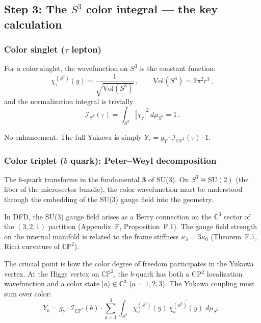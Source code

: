 \documentclass[11pt,a4paper]{article}
\newcommand{\CP}{\mathbb{CP}}
\newcommand{\C}{\mathbb{C}}
\newcommand{\Vol}{\mathrm{Vol}}
\theoremstyle{definition}
\theoremstyle{remark}
\begin{document}
\subsection{Step 3: The $S^3$ color integral --- the key calculation}
\label{sec:key}

\subsubsection{Color singlet ($\tau$ lepton)}

For a color singlet, the wavefunction on $S^3$ is the constant function:
\begin{equation}\label{eq:singlet-wf}
\chi_\tau^{(S^3)}(y) = \frac{1}{\sqrt{\Vol(S^3)}}\,,
\qquad \Vol(S^3) = 2\pi^2 r^3\,,
\end{equation}
and the normalization integral is trivially
\begin{equation}\label{eq:singlet-norm}
\mathcal{I}_{S^3}(\tau) = \int_{S^3} |\chi_\tau|^2\,d\mu_{S^3}
= 1\,.
\end{equation}

No enhancement.  The full Yukawa is simply
$Y_\tau = g_Y \cdot \mathcal{I}_{\CP^2}(\tau) \cdot 1$.

\subsubsection{Color triplet ($b$ quark): Peter--Weyl decomposition}

The $b$-quark transforms in the fundamental $\mathbf{3}$ of SU(3).
On $S^3 \cong \text{SU}(2)$ (the fiber of the microsector bundle),
the color wavefunction must be understood through the embedding of the
SU(3) gauge field into the geometry.

In DFD, the SU(3) gauge field arises as a Berry connection on the
$\C^3$ sector of the $(3,2,1)$ partition (Appendix~F, Proposition~F.1).
The gauge field strength on the internal manifold is related to the
frame stiffness $\kappa_3 = 3\kappa_0$ (Theorem~F.7, Ricci curvature
of $\CP^2$).

The crucial point is how the color degree of freedom participates in
the Yukawa vertex.  At the Higgs vertex on $\CP^2$, the $b$-quark has
both a CP$^2$ localization wavefunction and a color state
$|a\rangle \in \C^3$ ($a = 1,2,3$).  The Yukawa coupling must sum
over color:
\begin{equation}\label{eq:color-sum}
Y_b = g_Y \cdot \mathcal{I}_{\CP^2}(b) \cdot
\sum_{a=1}^{3} \int_{S^3}
\chi_a^{(S^3)}(y)\,\overline{\chi_a^{(S^3)}(y)}\;d\mu_{S^3}\,.
\end{equation}
\end{document}
